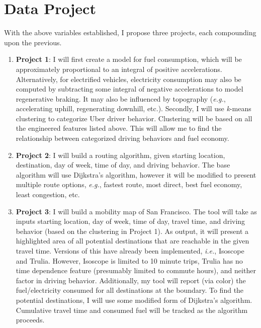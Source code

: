 \documentclass[12pt]{article}
\begin{document}
\section{Data Project}

With the above variables established, I propose three projects, each compounding upon the previous.

\begin{enumerate}

\item \textbf{Project 1}: I will first create a model for fuel consumption, which will be approximately proportional to an integral of positive accelerations. 
Alternatively, for electrified vehicles, electricity consumption may also be computed by subtracting some integral of negative accelerations to model 
regenerative braking. It may also be influenced by topography (\textit{e.g.}, accelerating uphill, regenerating downhill, etc.). Secondly, I will use 
\textit{k}-means clustering to categorize Uber driver behavior. Clustering will be based on all the engineered features listed above. This will allow me to find 
the relationship between categorized driving behaviors and fuel economy.

\item \textbf{Project 2}: I will build a routing algorithm, given starting location, destination, day of week, time of day, and driving behavior. The base 
algorithm will use Dijkstra's algorithm, however it will be modified to present multiple route options, \textit{e.g.}, fastest route, most direct, best fuel 
economy, least congestion, etc.

\item \textbf{Project 3}: I will build a mobility map of San Francisco. The tool will take as inputs starting location, day of week, time of day, travel time, 
and driving behavior (based on the clustering in Project 1). As output, it will present a highlighted area of all potential destinations that are reachable in 
the given travel time. Versions of this have already been implemented, \textit{i.e.}, Isoscope and Trulia. However, Isoscope is limited to 10 minute trips, 
Trulia has no time dependence feature (presumably limited to commute hours), and neither factor in driving behavior. Additionally, my tool will report (via 
color) the fuel/electricity consumed for all destinations at the boundary. To find the potential destinations, I will use some modified form of Dijkstra's 
algorithm. Cumulative travel time and consumed fuel will be tracked as the algorithm proceeds.

\end{enumerate}
\end{document}
